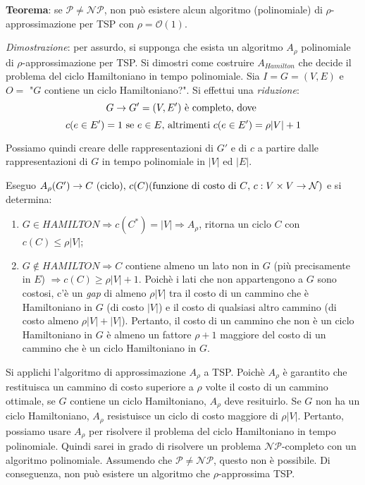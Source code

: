 \textbf{Teorema}: se $\mathcal{P} \ne \mathcal{NP}$, non può esistere alcun algoritmo
(polinomiale) di $\rho$-approssimazione per TSP con $\rho = \mathcal{O}(1)$.

\textit{Dimostrazione}: per assurdo, si supponga che esista un algoritmo $A_\rho$
polinomiale di $\rho$-approssimazione per TSP. Si dimostri come costruire $A_{Hamilton}$
che decide il problema del ciclo Hamiltoniano in tempo polinomiale. Sia $I = G =(V,E)$
e $O = $ "$G$ contiene un ciclo Hamiltoniano?". Si effettui una \textit{riduzione}:
\[
    G \rightarrow G' = (V, E') \textnormal{ è completo, dove }
\]
\[
    c(e \in E') = 1 \textnormal{ se } e \in E \textnormal{, altrimenti } c(e \in E') = \rho|V| + 1
\]

Possiamo quindi creare delle rappresentazioni di $G'$ e di $c$ a partire dalle rappresentazioni
di $G$ in tempo polinomiale in $|V|$ ed $|E|$.

Eseguo $A_\rho(G') \rightarrow C \textnormal{ (ciclo), } c(C) \textnormal{(funzione di costo di $C$, $c: V \times V \rightarrow \mathcal{N}$)}$ e si
determina:
\begin{enumerate}
\item $G \in HAMILTON \Rightarrow c(C^*) = |V| \Rightarrow A_\rho$, ritorna un ciclo $C$
con $c(C) \le \rho|V|$;
\item $G \not\in HAMILTON \Rightarrow C$ contiene almeno un lato non in
$G$ (più precisamente in $E$) $\Rightarrow c(C) \ge \rho|V| + 1$. Poichè i lati che non
appartengono a $G$ sono costosi, c'è un \textit{gap} di almeno $\rho |V|$ tra il costo di un cammino
che è Hamiltoniano in $G$ (di costo $|V|$) e il costo di qualsiasi altro cammino (di costo
almeno $\rho |V| + |V|$). Pertanto, il costo di un cammino che non è un ciclo Hamiltoniano
in $G$ è almeno un fattore $\rho + 1$ maggiore del costo di un cammino che è un ciclo
Hamiltoniano in $G$.
\end{enumerate}

Si applichi l'algoritmo di approssimazione $A_{\rho}$ a TSP. Poichè $A_{\rho}$ è garantito
che restituisca un cammino di costo superiore a $\rho$ volte il costo di un cammino ottimale,
se $G$ contiene un ciclo Hamiltoniano, $A_{\rho}$ deve resituirlo. Se $G$ non ha un ciclo
Hamiltoniano, $A_{\rho}$ resistuisce un ciclo di costo maggiore di $\rho |V|$.
Pertanto, possiamo usare $A_{\rho}$ per risolvere il problema del ciclo Hamiltoniano in
tempo polinomiale. Quindi sarei in grado di risolvere un problema $\mathcal{NP}$-completo
con un algoritmo polinomiale. Assumendo che $\mathcal{P} \ne \mathcal{NP}$, questo non è
possibile. Di conseguenza, non può esistere un algoritmo che $\rho$-approssima TSP.


